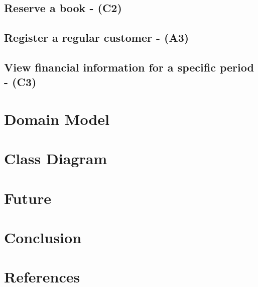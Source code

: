 \documentclass{article}
\begin{document}
% 

\newpage
\subsection{Reserve a book - (C2)}



\newpage
\subsection{Register a regular customer - (A3)}


\newpage
\subsection{View financial information for a specific period - (C3)}



\newpage
\section{Domain Model}


\newpage
\section{Class Diagram}


\newpage
\section{Future}


\newpage
\section{Conclusion}


\newpage
\section{References}

\end{document}
